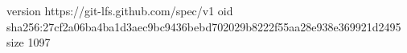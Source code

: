 version https://git-lfs.github.com/spec/v1
oid sha256:27cf2a06ba4ba1d3aec9bc9436bebd702029b8222f55aa28e938e369921d2495
size 1097
